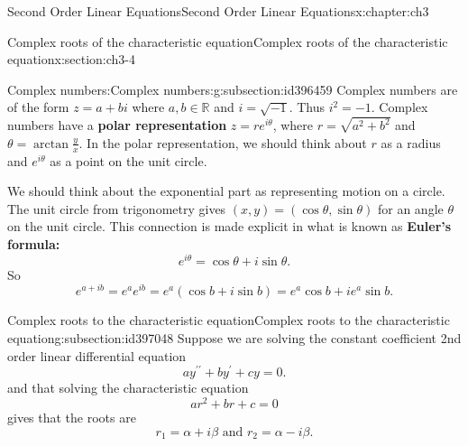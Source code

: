 \documentclass[oneside,10pt,]{book}
\newcommand{\terminology}[1]{\textbf{#1}}
\numberwithin{equation}{section}
\numberwithin{equation}{section}
\begin{document}
\begin{chapterptx}{Second Order Linear Equations}{}{Second Order Linear Equations}{}{}{x:chapter:ch3}
\typeout{************************************************}
%
\begin{sectionptx}{Complex roots of the characteristic equation}{}{Complex roots of the characteristic equation}{}{}{x:section:ch3-4}
%
%
\typeout{************************************************}
\typeout{************************************************}
%
\begin{subsectionptx}{Complex numbers:}{}{Complex numbers:}{}{}{g:subsection:id396459}
Complex numbers are of the form \(z = a+bi\) where \(a,b\in\mathbb{R}\) and \(i=\sqrt{-1}\). Thus \(i^{2}=-1\). Complex numbers have a \terminology{polar representation} \(z = r e^{i\theta}\), where \(r = \sqrt{a^2 + b^2}\) and \(\theta = \arctan\frac{y}{x}\). In the polar representation, we should think about \(r\) as a radius and \(e^{i\theta}\) as a point on the unit circle.%
\par
We should think about the exponential part as representing motion on a circle. The unit circle from trigonometry gives \((x,y) = (\cos \theta, \sin \theta)\) for an angle \(\theta\) on the unit circle. This connection is made explicit in what is known as \terminology{Euler's formula:}%
\begin{equation*}
e^{i\theta}=\cos \theta+i\sin \theta.
\end{equation*}
So%
\begin{equation*}
e^{a+ib}=e^{a}e^{ib}=e^{a}\left(\cos b+i\sin b\right)=e^{a}\cos b+ie^{a}\sin b.
\end{equation*}
%
\end{subsectionptx}
%
%
\typeout{************************************************}
\typeout{************************************************}
%
\begin{subsectionptx}{Complex roots to the characteristic equation}{}{Complex roots to the characteristic equation}{}{}{g:subsection:id397048}
Suppose we are solving the constant coefficient 2nd order linear differential equation%
\begin{equation*}
ay^{\prime\prime}+by^{\prime}+cy=0.
\end{equation*}
and that solving the characteristic equation%
\begin{equation*}
ar^{2}+br+c=0
\end{equation*}
gives that the roots are%
\begin{equation*}
r_1=\alpha + i\beta \text{ and }r_2=\alpha  - i\beta.

\end{equation*}
\end{subsectionptx}
\end{sectionptx}
\end{chapterptx}
\end{document}
